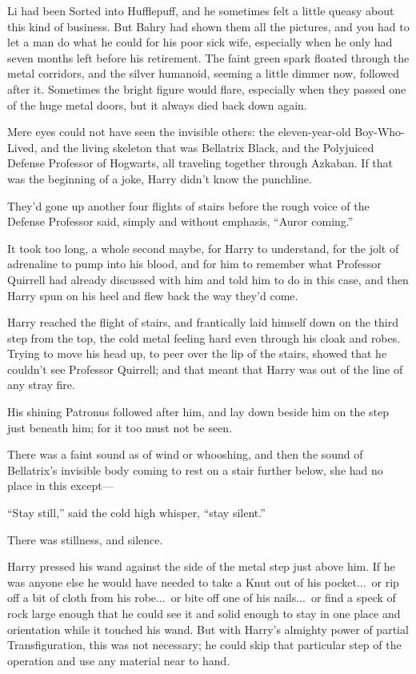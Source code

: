 Li had been Sorted into Hufflepuff, and he sometimes felt a little queasy about this kind of business. But Bahry had shown them all the pictures, and you had to let a man do what he could for his poor sick wife, especially when he only had seven months left before his retirement.
\sbreak
The faint green spark floated through the metal corridors, and the silver humanoid, seeming a little dimmer now, followed after it. Sometimes the bright figure would flare, especially when they passed one of the huge metal doors, but it always died back down again.

Mere eyes could not have seen the invisible others: the eleven-year-old Boy-Who-Lived, and the living skeleton that was Bellatrix Black, and the Polyjuiced Defense Professor of Hogwarts, all traveling together through Azkaban. If that was the beginning of a joke, Harry didn’t know the punchline.

They’d gone up another four flights of stairs before the rough voice of the Defense Professor said, simply and without emphasis, “Auror coming.”

It took too long, a whole second maybe, for Harry to understand, for the jolt of adrenaline to pump into his blood, and for him to remember what Professor Quirrell had already discussed with him and told him to do in this case, and then Harry spun on his heel and flew back the way they’d come.

Harry reached the flight of stairs, and frantically laid himself down on the third step from the top, the cold metal feeling hard even through his cloak and robes. Trying to move his head up, to peer over the lip of the stairs, showed that he couldn’t see Professor Quirrell; and that meant that Harry was out of the line of any stray fire.

His shining Patronus followed after him, and lay down beside him on the step just beneath him; for it too must not be seen.

There was a faint sound as of wind or whooshing, and then the sound of Bellatrix’s invisible body coming to rest on a stair further below, she had no place in this except—

“Stay still,” said the cold high whisper, “stay silent.”

There was stillness, and silence.

Harry pressed his wand against the side of the metal step just above him. If he was anyone else he would have needed to take a Knut out of his pocket...\ or rip off a bit of cloth from his robe...\ or bite off one of his nails...\ or find a speck of rock large enough that he could see it and solid enough to stay in one place and orientation while it touched his wand. But with Harry’s almighty power of partial Transfiguration, this was not necessary; he could skip that particular step of the operation and use any material near to hand.

